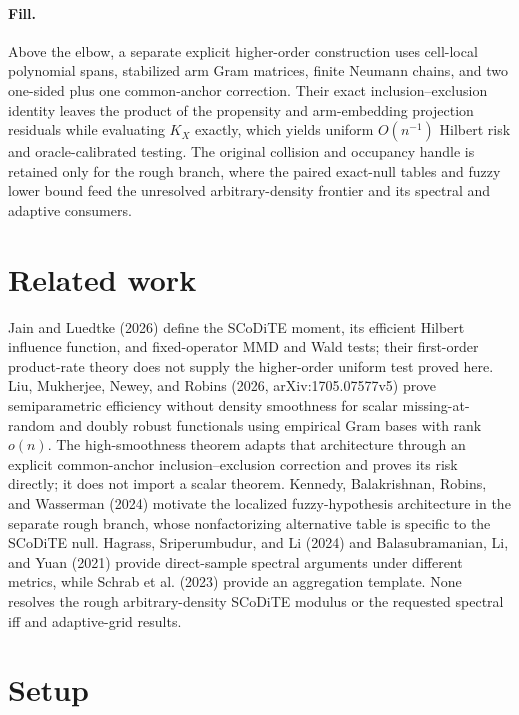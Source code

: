 \documentclass{article}
\begin{document}
\paragraph{Fill.} Above the elbow, a separate explicit higher-order construction uses cell-local polynomial spans, stabilized arm Gram matrices, finite Neumann chains, and two one-sided plus one common-anchor correction. Their exact inclusion--exclusion identity leaves the product of the propensity and arm-embedding projection residuals while evaluating \(K_X\) exactly, which yields uniform \(O(n^{-1})\) Hilbert risk and oracle-calibrated testing. The original collision and occupancy handle is retained only for the rough branch, where the paired exact-null tables and fuzzy lower bound feed the unresolved arbitrary-density frontier and its spectral and adaptive consumers.

\section{Related work}

Jain and Luedtke (2026) define the SCoDiTE moment, its efficient Hilbert influence function, and fixed-operator MMD and Wald tests; their first-order product-rate theory does not supply the higher-order uniform test proved here. Liu, Mukherjee, Newey, and Robins (2026, arXiv:1705.07577v5) prove semiparametric efficiency without density smoothness for scalar missing-at-random and doubly robust functionals using empirical Gram bases with rank \(o(n)\). The high-smoothness theorem adapts that architecture through an explicit common-anchor inclusion--exclusion correction and proves its risk directly; it does not import a scalar theorem. Kennedy, Balakrishnan, Robins, and Wasserman (2024) motivate the localized fuzzy-hypothesis architecture in the separate rough branch, whose nonfactorizing alternative table is specific to the SCoDiTE null. Hagrass, Sriperumbudur, and Li (2024) and Balasubramanian, Li, and Yuan (2021) provide direct-sample spectral arguments under different metrics, while Schrab et al. (2023) provide an aggregation template. None resolves the rough arbitrary-density SCoDiTE modulus or the requested spectral iff and adaptive-grid results.

\section{Setup}
\end{document}
